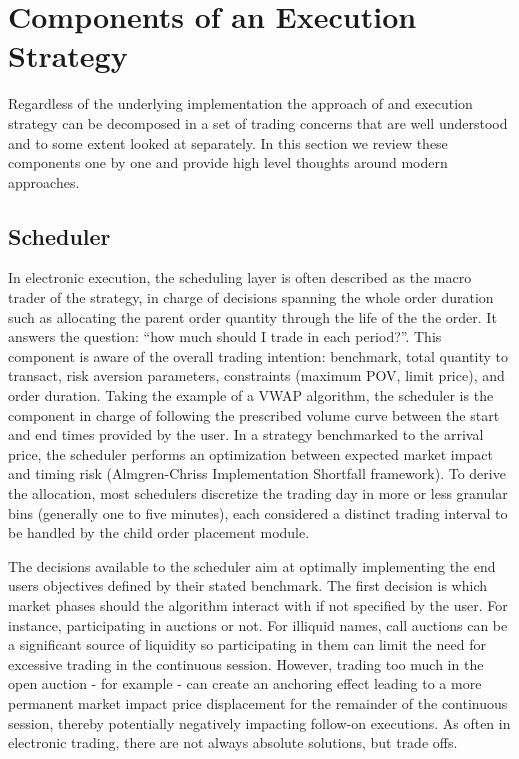\section{Components of an Execution Strategy}

Regardless of the underlying implementation the approach of and execution strategy can be decomposed in a set of trading concerns that are well understood and to some extent looked at separately. In this section we review these components one by one and provide high level thoughts around modern approaches.

\subsection{Scheduler}
In electronic execution, the scheduling layer is often described as the macro trader of the strategy, in charge of decisions spanning the whole order duration such as allocating the parent order quantity through the life of the the order. It answers the question: “how much should I trade in each period?”.
This component is aware of the overall trading intention: benchmark, total quantity to transact, risk aversion parameters, constraints (maximum POV, limit price), and order duration. Taking the example of a VWAP algorithm, the scheduler is the component in charge of following the prescribed volume curve between the start and end times provided by the user. In a strategy benchmarked to the arrival price, the scheduler performs an optimization between expected market impact and timing risk (Almgren-Chriss Implementation Shortfall framework). To derive the allocation, most schedulers discretize the trading day in more or less granular bins (generally one to five minutes), each considered a distinct trading interval to be handled by the child order placement module.

The decisions available to the scheduler aim at optimally implementing the end users objectives defined by their stated benchmark. The first decision is which market phases should the algorithm interact with if not specified by the user. For instance, participating in auctions or not. For illiquid names, call auctions can be a significant source of liquidity so participating in them can limit the need for excessive trading in the continuous session. However, trading too much in the open auction - for example - can create an anchoring effect leading to a more permanent market impact price displacement for the remainder of the continuous session, thereby potentially negatively impacting follow-on executions. As often in electronic trading, there are not always absolute solutions, but trade offs.

